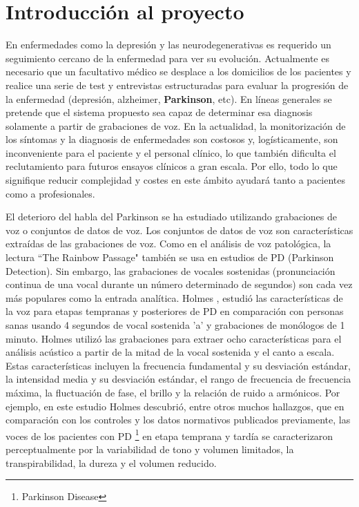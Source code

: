 
\section{Introducción al proyecto}
En enfermedades como la depresión y las neurodegenerativas es requerido un seguimiento cercano de la enfermedad para ver su evolución. Actualmente es necesario que un facultativo médico se desplace a los domicilios de los pacientes y realice una serie de test y entrevistas estructuradas para evaluar la progresión de la enfermedad (depresión, alzheimer, \textbf{Parkinson}, etc). En líneas generales se pretende que el sistema propuesto sea capaz de determinar esa diagnosis solamente a partir de grabaciones de voz. En la actualidad, la monitorización de los síntomas y la diagnosis de enfermedades son costosos y, logísticamente, son inconveniente para el paciente y el personal clínico, lo que también dificulta el reclutamiento para futuros ensayos clínicos a gran escala. Por ello, todo lo que signifique reducir complejidad y costes en este ámbito ayudará tanto a pacientes como a profesionales.

El deterioro del habla del Parkinson se ha estudiado utilizando grabaciones de voz o conjuntos de datos de voz. Los conjuntos de datos de voz son características extraídas de las grabaciones de voz. Como en el análisis de voz patológica, la lectura ``The Rainbow Passage" también se usa en estudios de PD (Parkinson Detection). Sin embargo, las grabaciones de vocales sostenidas (pronunciación continua de una vocal durante un número determinado de segundos) son cada vez más populares como la entrada analítica. Holmes \cite{j2000voice}, estudió las características de la voz para etapas tempranas y posteriores de PD en comparación con personas sanas usando 4 segundos de vocal sostenida 'a' y grabaciones de monólogos de 1 minuto. 
Holmes utilizó las grabaciones para extraer ocho características para el análisis acústico a partir de la mitad de la vocal sostenida y el canto a escala. Estas características incluyen la frecuencia fundamental y su desviación estándar, la intensidad media y su desviación estándar, el rango de frecuencia de frecuencia máxima, la fluctuación de fase, el brillo y la relación de ruido a armónicos. Por ejemplo, en este estudio Holmes descubrió, entre otros muchos hallazgos, que en comparación con los controles y los datos normativos publicados previamente, las voces de los pacientes con PD \footnote{Parkinson Disease} en etapa temprana y tardía se caracterizaron perceptualmente por la variabilidad de tono y volumen limitados, la transpirabilidad, la dureza y el volumen reducido.


